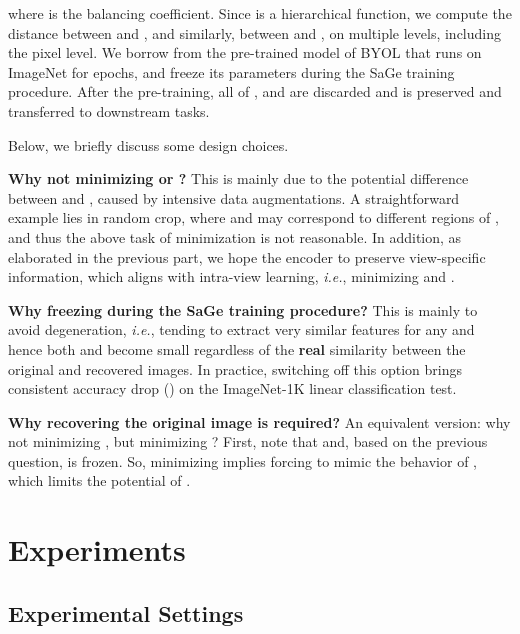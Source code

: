 \documentclass[10pt,twocolumn,letterpaper]{article}
\begin{document}
where  is the balancing coefficient. Since  is a hierarchical function, we compute the distance between  and , and similarly, between  and , on multiple levels, including the pixel level. We borrow  from the pre-trained model of BYOL that runs on ImageNet for  epochs, and freeze its parameters during the SaGe training procedure. After the pre-training, all of ,  and  are discarded and  is preserved and transferred to downstream tasks.

Below, we briefly discuss some design choices.

\vspace{0.1cm}\noindent
\hspace{0.2cm}\textbf{Why not minimizing  or ?} This is mainly due to the potential difference between  and , caused by intensive data augmentations. A straightforward example lies in random crop, where  and  may correspond to different regions of , and thus the above task of minimization is not reasonable. In addition, as elaborated in the previous part, we hope the encoder to preserve view-specific information, which aligns with intra-view learning, \textit{i.e.}, minimizing  and .

\vspace{0.1cm}\noindent
\hspace{0.2cm}\textbf{Why freezing  during the SaGe training procedure?} This is mainly to avoid degeneration, \textit{i.e.},  tending to extract very similar features for any  and hence both  and  become small regardless of the \textbf{real} similarity between the original and recovered images. In practice, switching off this option brings consistent accuracy drop () on the ImageNet-1K linear classification test.

\vspace{0.1cm}\noindent
\hspace{0.2cm}\textbf{Why recovering the original image is required?} An equivalent version: why not minimizing , but minimizing ? First, note that  and,
based on the previous question,  is frozen. So, minimizing  implies forcing  to mimic the behavior of , which limits the potential of . 


\section{Experiments}
\label{sec:experiment}

\subsection{Experimental Settings}
\label{exp:details}
\end{document}
